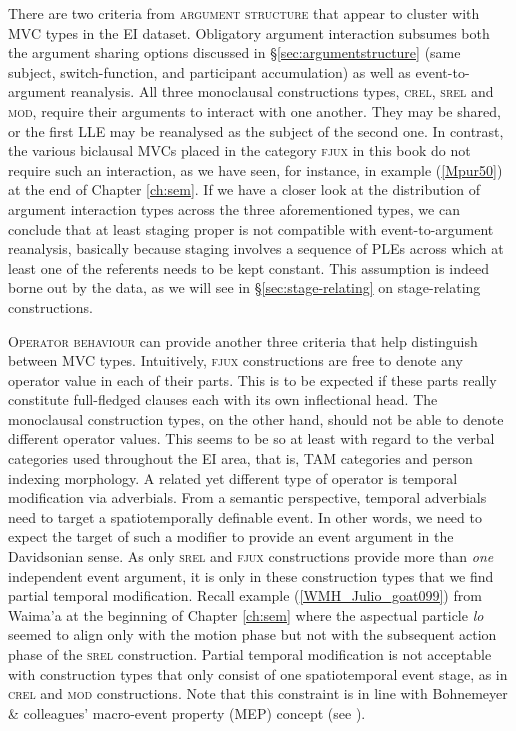 There are two criteria from \textsc{argument structure} that appear to cluster with MVC types in the EI dataset. Obligatory argument interaction subsumes both the argument sharing options discussed in §\ref{sec:argumentstructure} (same subject, switch-function, and participant accumulation) as well as event-to-argument reanalysis. All three monoclausal constructions types, \textsc{crel}, \textsc{srel} and \textsc{mod}, require their arguments to interact with one another. They may be shared, or the first LLE may be reanalysed as the subject of the second one. In contrast, the various biclausal MVCs placed in the category \textsc{fjux} in this book do not require such an interaction, as we have seen, for instance, in example (\ref{Mpur50}) at the end of Chapter \ref{ch:sem}. If we have a closer look at the distribution of argument interaction types across the three aforementioned types, we can conclude that at least staging proper is not compatible with event-to-argument reanalysis, basically because staging involves a sequence of PLEs across which at least one of the referents needs to be kept constant. This assumption is indeed borne out by the data, as we will see in §\ref{sec:stage-relating} on stage-relating constructions.

\textsc{Operator behaviour} can provide another three criteria that help distinguish between MVC types. Intuitively, \textsc{fjux} constructions are free to denote any operator value in each of their parts. This is to be expected if these parts really constitute full-fledged clauses each with its own inflectional head. The monoclausal construction types, on the other hand, should not be able to denote different operator values. This seems to be so at least with regard to the verbal categories used throughout the EI area, that is, TAM categories and person indexing morphology. A related yet different type of operator is temporal modification via adverbials. From a semantic perspective, temporal adverbials need to target a spatiotemporally definable event. In other words, we need to expect the target of such a modifier to provide an event argument in the Davidsonian sense. As only \textsc{srel} and \textsc{fjux} constructions provide more than \emph{one} independent event argument, it is only in these construction types that we find partial temporal modification. Recall example (\ref{WMH_Julio_goat099}) from Waima'a at the beginning of Chapter \ref{ch:sem} where the aspectual particle \textit{lo} seemed to align only with the motion phase but not with the subsequent action phase of the \textsc{srel} construction. Partial temporal modification is not acceptable with construction types that only consist of one spatiotemporal event stage, as in \textsc{crel} and \textsc{mod} constructions. Note that this constraint is in line with Bohnemeyer \& colleagues' macro-event property (MEP) concept (see \citealt{bohnemeyer2007principles, bohnemeyer2011}).

